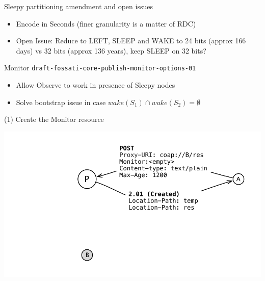 \documentclass{beamer}
\begin{document}
\begin{frame}{Sleepy partitioning amendment and open issues}

\begin{itemize}
 \item Encode in Seconds (finer granularity is a matter of RDC)
 \item Open Issue: Reduce to LEFT, SLEEP and WAKE to 24 bits (approx 166 days) vs 32 bits (approx 136 years), keep SLEEP on 32 bits?
\end{itemize}


\end{frame}

\begin{frame}{Monitor \hspace{5cm} {\tiny \texttt{draft-fossati-core-publish-monitor-options-01}}}

\begin{itemize}
 \item Allow Observe to work in presence of Sleepy nodes %
 \item Solve bootstrap issue in case {\scriptsize $wake(S_1) \cap wake(S_2) = \emptyset$}
\end{itemize}

\end{frame}


\begin{frame}{(1) Create the Monitor resource}
 \begin{center}
  \includegraphics[width=\textwidth]{../../share/images/monitor1.pdf}
 \end{center}
\end{frame}
\end{document}
